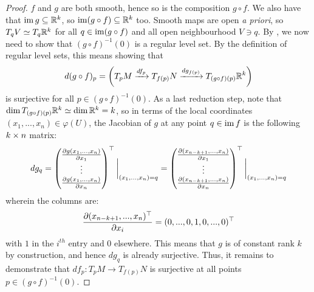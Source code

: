 \begin{proof}
                $f$ and $g$ are both smooth, hence so is the composition $g \circ f$. We also have that $\operatorname{im} g \subseteq \mathbb{R}^k$, so $\operatorname{im}(g \circ f) \subseteq \mathbb{R}^k$ too. Smooth maps are open \textit{a priori}, so $T_qV \simeq T_q\mathbb{R}^k$ for all $q \in \operatorname{im}(g \circ f)$ and all open neighbourhood $V \ni q$. By \cite[Corollary 5.14]{lee_smooth_manifolds}, we now need to show that $(g \circ f)^{-1}(0)$ is a regular level set. By the definition of regular level sets, this means showing that 
                    $$d(g \circ f)_p = \left( T_pM \xrightarrow[]{df_p} T_{f(p)}N \xrightarrow[]{dg_{f(p)}} T_{(g \circ f)(p)}\mathbb{R}^k \right)$$
                is surjective for all $p \in (g \circ f)^{-1}(0)$. As a last reduction step, note that $\dim T_{(g \circ f)(p)}\mathbb{R}^k \simeq \dim \mathbb{R}^k = k$, so in terms of the local coordinates $(x_1, ..., x_n) \in \varphi(U)$, the Jacobian of $g$ at any point $q \in \operatorname{im} f$ is the following $k \x n$ matrix:
                    $$
                        dg_q =
                        \begin{pmatrix}
                            \frac{\partial g(x_1, ..., x_n)}{\partial x_1}
                            \\
                            \vdots
                            \\
                            \frac{\partial g(x_1, ..., x_n)}{\partial x_n}
                        \end{pmatrix}^{\top} \bigg|_{(x_1, ..., x_n) = q}
                        =
                        \begin{pmatrix}
                            \frac{\partial (x_{n - k + 1}, ..., x_n)}{\partial x_1}
                            \\
                            \vdots
                            \\
                            \frac{\partial (x_{n - k + 1}, ..., x_n)}{\partial x_n}
                        \end{pmatrix}^{\top} \bigg|_{(x_1, ..., x_n) = q}
                    $$
                wherein the columns are:
                    $$\frac{\partial (x_{n - k + 1}, ..., x_n)^{\top}}{\partial x_i} = (0, ..., 0, 1, 0, ..., 0)^{\top}$$
                with $1$ in the $i^{th}$ entry and $0$ elsewhere. This means that $g$ is of constant rank $k$ by construction, and hence $dg_q$ is already surjective. Thus, it remains to demonstrate that $df_p: T_pM \to T_{f(p)}N$ is surjective at all points $p \in (g \circ f)^{-1}(0)$.
                

\end{proof}
